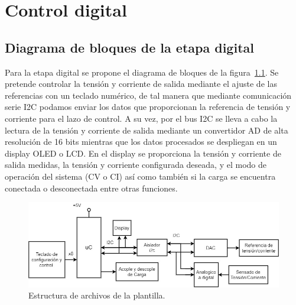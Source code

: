 \chapter{Control digital}

\label{C:Digitalización y control}

\section{Diagrama de bloques de la etapa digital}
Para la etapa digital se propone el diagrama de bloques de la figura~\ref{F:diagrama_digital}. Se pretende controlar la tensión y corriente de salida mediante el ajuste de las referencias con un teclado numérico, de tal manera que mediante comunicación serie I2C podamos enviar los datos que proporcionan la referencia de tensión y corriente para el lazo de control. A su vez, por el bus I2C se lleva a cabo la lectura de la tensión y corriente de salida mediante un convertidor AD de alta resolución de 16 bits mientras que los datos procesados se despliegan en un display OLED o LCD. En el display se proporciona la tensión y corriente de salida medidas, la tensión y corriente configurada deseada, y el modo de operación del sistema (CV o CI) así como también si la carga se encuentra conectada o desconectada entre otras funciones. 

\begin{figure} [H]
    \centering
    \includegraphics[scale=0.5]{./imagenes/diagrama_digital.jpg}
    \caption{Estructura de archivos de la plantilla.}
    \label{F:diagrama_digital}
\end{figure}


